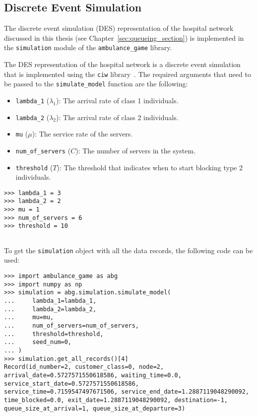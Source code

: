 \subsection{Discrete Event Simulation}

The discrete event simulation (DES) representation of the hospital network
discussed in this thesis (see Chapter~\ref{sec:queueing_section}) is
implemented in the \texttt{simulation} module of the \texttt{ambulance\_game}
library.

The DES representation of the hospital network is a discrete event simulation
that is implemented using the \texttt{ciw} library~\cite{ciwpython}.
The required arguments that need to be passed to the
\texttt{simulate\_model} function are the following:

\begin{itemize}
    \item \texttt{lambda\_1} (\(\lambda_1\)): The arrival rate of class 1
    individuals.
    \item \texttt{lambda\_2} (\(\lambda_2\)): The arrival rate of class 2
    individuals.
    \item \texttt{mu} (\(\mu\)): The service rate of the servers.
    \item \texttt{num\_of\_servers} (\(C\)): The number of servers in the
    system.
    \item \texttt{threshold} (\(T\)): The threshold that indicates when to start
    blocking type 2 individuals.
\end{itemize}

\begin{lstlisting}[style=pystyle]
>>> lambda_1 = 3
>>> lambda_2 = 2
>>> mu = 1
>>> num_of_servers = 6
>>> threshold = 10
    
\end{lstlisting}

To get the \texttt{simulation} object with all the data records, the following
code can be used:

\begin{lstlisting}[style=pystyle]
>>> import ambulance_game as abg
>>> import numpy as np
>>> simulation = abg.simulation.simulate_model(
...     lambda_1=lambda_1,
...     lambda_2=lambda_2,
...     mu=mu,
...     num_of_servers=num_of_servers,
...     threshold=threshold,
...     seed_num=0,
... )
>>> simulation.get_all_records()[4]
Record(id_number=2, customer_class=0, node=2, arrival_date=0.5727571550618586, waiting_time=0.0, service_start_date=0.5727571550618586, service_time=0.7159547497671506, service_end_date=1.2887119048290092, time_blocked=0.0, exit_date=1.2887119048290092, destination=-1, queue_size_at_arrival=1, queue_size_at_departure=3)

\end{lstlisting}

